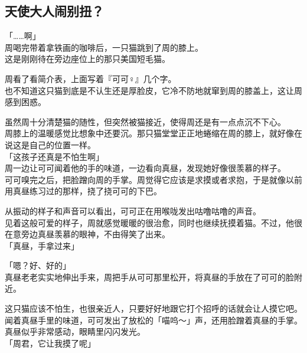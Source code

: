 \subsection{天使大人闹别扭？}

「……啊」\\

周喝完带着拿铁画的咖啡后，一只猫跳到了周的膝上。\\

这是刚刚待在旁边座位上的那只美国短毛猫。

周看了看简介表，上面写着『可可♀』几个字。\\

也不知道这只猫到底是不认生还是厚脸皮，它冷不防地就窜到周的膝盖上，这让周感到困惑。

虽然周十分清楚猫的随性，但突然被猫接近，使得周还是有一点点沉不下心。\\

周膝上的温暖感觉比想象中还要沉。那只猫堂堂正正地蜷缩在周的膝上，就好像在说这是自己的位置一样。\\

「这孩子还真是不怕生啊」\\

周一边让可可闻着他的手的味道，一边看向真昼，发现她好像很羡慕的样子。\\

可可嗅完之后，把脸蹭向周的手掌。周觉得它应该是求摸或者求抱，于是就像以前用真昼练习过的那样，挠了挠可可的下巴。

从振动的样子和声音可以看出，可可正在用喉咙发出咕噜咕噜的声音。\\

见着这般可爱的样子，周就感觉暖暖的很治愈，同时也继续抚摸着猫。不过，他很在意旁边真昼羡慕的眼神，不由得笑了出来。\\

「真昼，手拿过来」

「嗯？好、好的」\\

真昼老老实实地伸出手来，周把手从可可那里松开，将真昼的手放在了可可的脸附近。

这只猫应该不怕生，也很亲近人，只要好好地跟它打个招呼的话就会让人摸它吧。\\

闻着真昼手里的味道，可可发出了放松的「喵呜～」声，还用脸蹭着真昼的手掌。真昼似乎非常感动，眼睛里闪闪发光。\\

「周君，它让我摸了呢」\\

